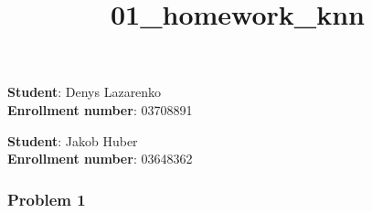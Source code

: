 \documentclass[11pt]{article}
\title{01\_homework\_knn}
\begin{document}
    
    
    \maketitle
    
    

    
    \textbf{Student}: Denys Lazarenko\\
\textbf{Enrollment number}: 03708891

\textbf{Student}: Jakob Huber\\
\textbf{Enrollment number}: 03648362

\hypertarget{problem-1}{%
\subsubsection{Problem 1}\label{problem-1}}
\end{document}
